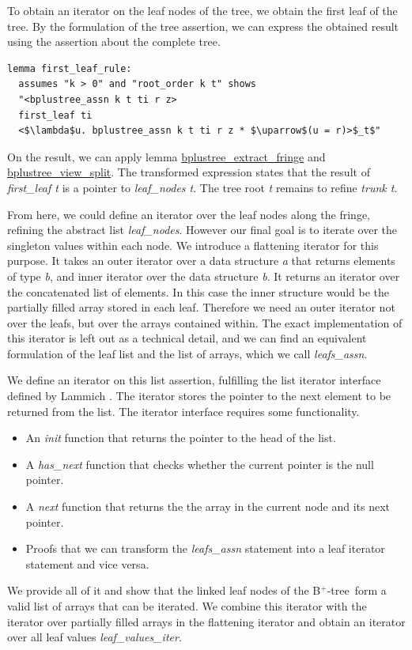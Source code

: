 \documentclass[a4paper,UKenglish,cleveref, autoref, thm-restate]{lipics-v2021}
\newcommand{\btree}{B$^+$-tree}
\begin{document}
To obtain an iterator on the leaf nodes of the tree,
we obtain the first leaf of the tree.
By the formulation of the tree assertion, we can express
the obtained result using the assertion about the complete tree.

\begin{lstlisting}[mathescape=true, language=Isabelle,label=lst:btree-first-leaf]
lemma first_leaf_rule:
  assumes "k > 0" and "root_order k t" shows
  "<bplustree_assn k t ti r z>
  first_leaf ti
  <$\lambda$u. bplustree_assn k t ti r z * $\uparrow$(u = r)>$_t$"
\end{lstlisting}

On the result, we can apply lemma \hyperref[lst:btree-extract-fringe]{bplustree\_extract\_fringe} 
and \hyperref[lst:btree-view-split]{bplustree\_view\_split}.
The transformed expression states that
the result of \emph{first\_leaf t} is a pointer to \emph{leaf\_nodes t}.
The tree root \emph{t} remains to refine \emph{trunk t}.

From here, we could define an iterator over the leaf nodes
along the fringe, refining the abstract list \emph{leaf\_nodes}.
However our final goal is to iterate over the singleton values within each node.
We introduce a flattening iterator for this purpose.
It takes an outer iterator over a data structure \textit{a} that returns elements of type \textit{b},
and inner iterator over the data structure \textit{b}.
It returns an iterator over the concatenated list of elements.
In this case the inner structure would be the partially filled array
stored in each leaf.
Therefore we need an outer iterator not over the leafs, but over the arrays
contained within.
The exact implementation of this iterator is left out as a technical detail,
and we can find an equivalent formulation of the leaf list and the list of arrays,
which we call \emph{leafs\_assn}.

We define an iterator on this list assertion,
fulfilling the list iterator interface defined by Lammich \cite{DBLP:conf/itp/Lammich19}.
The iterator stores the pointer to the next element to be returned from the list.
The iterator interface requires some functionality.
\begin{itemize}
    \item An \emph{init} function that returns the pointer to the head of the list.
    \item A \emph{has\_next} function that checks whether the current pointer is the null pointer.
    \item A \emph{next} function that returns the the array in the current node and its next pointer.
    \item Proofs that we can transform the \emph{leafs\_assn} statement into 
          a leaf iterator statement and vice versa.
\end{itemize}
We provide all of it and show that the linked leaf nodes of the \btree\ form a valid
list of arrays that can be iterated.
We combine this iterator with the iterator over partially filled arrays
in the flattening iterator and obtain an iterator over all leaf values \emph{leaf\_values\_iter}.
\end{document}
